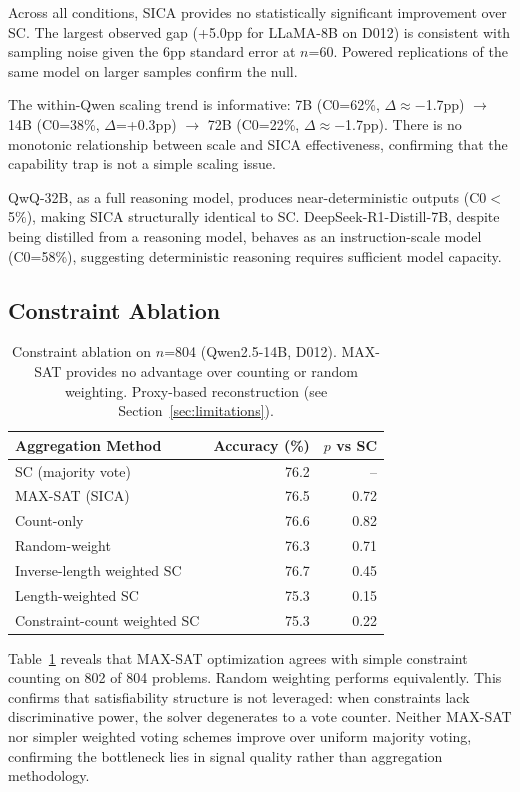 \documentclass[11pt,a4paper]{article}
\begin{document}
Across all conditions, SICA provides no statistically significant improvement over SC. The largest observed gap (+5.0pp for LLaMA-8B on D012) is consistent with sampling noise given the 6pp standard error at $n$=60. Powered replications of the same model on larger samples confirm the null.

The within-Qwen scaling trend is informative: 7B (C0=62\%, $\Delta$$\approx$$-$1.7pp) $\rightarrow$ 14B (C0=38\%, $\Delta$=+0.3pp) $\rightarrow$ 72B (C0=22\%, $\Delta$$\approx$$-$1.7pp). There is no monotonic relationship between scale and SICA effectiveness, confirming that the capability trap is not a simple scaling issue.

QwQ-32B, as a full reasoning model, produces near-deterministic outputs (C0$<$5\%), making SICA structurally identical to SC. DeepSeek-R1-Distill-7B, despite being distilled from a reasoning model, behaves as an instruction-scale model (C0=58\%), suggesting deterministic reasoning requires sufficient model capacity.

\subsection{Constraint Ablation}

\begin{table}[t]
\centering
\small
\caption{Constraint ablation on $n$=804 (Qwen2.5-14B, D012). MAX-SAT provides no advantage over counting or random weighting. Proxy-based reconstruction (see Section~\ref{sec:limitations}).}
\label{tab:ablation}
\begin{tabular}{lrr}
\toprule
Aggregation Method & Accuracy (\%) & $p$ vs SC \\
\midrule
SC (majority vote) & 76.2 & -- \\
MAX-SAT (SICA) & 76.5 & 0.72 \\
Count-only & 76.6 & 0.82 \\
Random-weight & 76.3 & 0.71 \\
\midrule
Inverse-length weighted SC & 76.7 & 0.45 \\
Length-weighted SC & 75.3 & 0.15 \\
Constraint-count weighted SC & 75.3 & 0.22 \\
\bottomrule
\end{tabular}
\end{table}

Table~\ref{tab:ablation} reveals that MAX-SAT optimization agrees with simple constraint counting on 802 of 804 problems. Random weighting performs equivalently. This confirms that satisfiability structure is not leveraged: when constraints lack discriminative power, the solver degenerates to a vote counter. Neither MAX-SAT nor simpler weighted voting schemes improve over uniform majority voting, confirming the bottleneck lies in signal quality rather than aggregation methodology.
\end{document}
